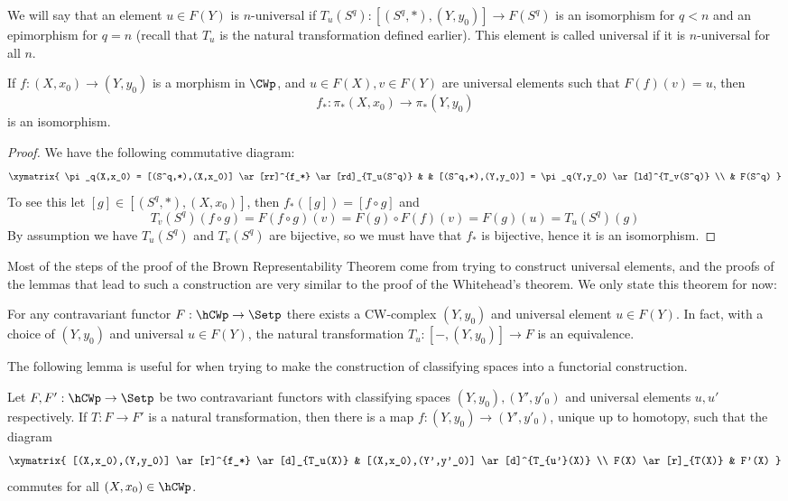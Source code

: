 We will say that an element $u \in F(Y)$ is $n$-universal if $T_u(S^q) : [(S^q,*),(Y,y_0)] \rightarrow F(S^q)$ is an isomorphism for $q<n$ and an epimorphism for $q=n$ (recall that $T_u$ is the natural transformation defined earlier). This element is called universal if it is $n$-universal for all $n$.


\begin{thm}
\label{mapping-of-universal-elements}
If $f : (X,x_0) \rightarrow (Y,y_0)$ is a morphism in $\CWp$, and $u \in F(X),v \in F(Y)$ are universal elements such that $F(f)(v) = u$, then
\[ f_* : \pi_*(X,x_0) \longrightarrow \pi_*(Y,y_0) \]
is an isomorphism.
\end{thm}
\begin{proof}
We have the following commutative diagram:
\[
\xymatrix
{
\pi_q(X,x_0) = [(S^q,*),(X,x_0)] \ar[rr]^{f_*} \ar[rd]_{T_u(S^q)} & & [(S^q,*),(Y,y_0)] = \pi_q(Y,y_0) \ar[ld]^{T_v(S^q)} \\
& F(S^q) 
}
\]
To see this let $[g] \in [(S^q,*),(X,x_0)]$, then $f_*([g]) = [f \circ g]$ and 
\[ T_v(S^q)(f \circ g) = F(f \circ g)(v) = F(g) \circ F(f) (v) = F(g)(u) = T_u(S^q)(g) \]
By assumption we have $T_u(S^q)$ and $T_v(S^q)$ are bijective, so we must have that $f_*$ is bijective, hence it is an isomorphism.
\end{proof}


Most of the steps of the proof of the Brown Representability Theorem come from trying to construct universal elements, and the proofs of the lemmas that lead to such a construction are very similar to the proof of the Whitehead's theorem. We only state this theorem for now:

\begin{lem}
For any contravariant functor $F : \hCWp \rightarrow \Setp$ there exists a CW-complex $(Y,y_0)$ and universal element $u \in F(Y)$. In fact, with a choice of $(Y,y_0)$ and universal $u \in F(Y)$, the natural transformation $T_u : [-,(Y,y_0)] \rightarrow F$ is an equivalence.
\end{lem}

The following lemma is useful for when trying to make the construction of classifying spaces into a functorial construction.

\begin{lem}
\label{inducedmapclassifyingspaces}
Let $F,F' : \hCWp \rightarrow \Setp$ be two contravariant functors with classifying spaces $(Y,y_0),(Y',y'_0)$ and universal elements $u,u'$ respectively. If $T : F \rightarrow F'$ is a natural transformation, then there is a map $f : (Y,y_0) \rightarrow (Y',y'_0)$, unique up to homotopy, such that the diagram
\[
\xymatrix
{
  [(X,x_0),(Y,y_0)] \ar[r]^{f_*} \ar[d]_{T_u(X)} & [(X,x_0),(Y',y'_0)] \ar[d]^{T_{u'}(X)} \\
  F(X) \ar[r]_{T(X)} & F'(X)
}
\]
commutes for all $(X,x_0) \in \hCWp$.
\end{lem}

